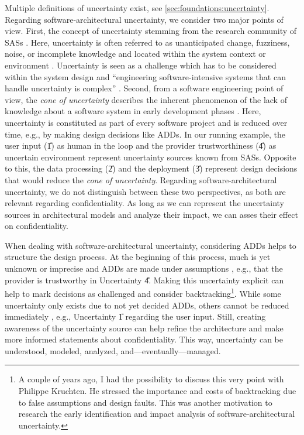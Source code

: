 Multiple definitions of uncertainty exist, see \autoref{sec:foundations:uncertainty}.
Regarding software-architectural uncertainty, we consider two major points of view.
First, the concept of uncertainty stemming from the research community of \acp{SAS} \cite{weyns_towards_2023,weyns_introduction_2020}.
Here, uncertainty is often referred to as unanticipated change, fuzziness, noise, or incomplete knowledge \cite{weyns_towards_2023} and located within the system context or environment \cite{weyns_introduction_2020}.
Uncertainty is seen as a challenge which has to be considered within the system design and \enquote{engineering software-intensive systems that can handle uncertainty is complex} \cite{weyns_introduction_2020}.
Second, from a software engineering point of view, the \emph{cone of uncertainty} describes the inherent phenomenon of the lack of knowledge about a software system in early development phases \cite{mcconnell_software_1998}.
Here, uncertainty is constituted as part of every software project and is reduced over time, e.g., by making design decisions like \acp{ADD}.
In our running example, the user input (\U{1}) as human in the loop and the provider trustworthiness (\U{4}) as uncertain environment represent uncertainty sources known from \acp{SAS}.
Opposite to this, the data processing (\U{2}) and the deployment (\U{3}) represent design decisions that would reduce the \emph{cone of uncertainty}.
Regarding software-architectural uncertainty, we do not distinguish between these two perspectives, as both are relevant regarding confidentiality.
As long as we can represent the uncertainty sources in architectural models and analyze their impact, we can asses their effect on confidentiality.

When dealing with software-architectural uncertainty, considering \acp{ADD} helps to structure the design process.
At the beginning of this process, much is yet unknown or imprecise and \acp{ADD} are made under assumptions \cite{mcconnell_software_1998}, e.g., that the provider is trustworthy in Uncertainty \U{4}.
Making this uncertainty explicit can help to mark decisions as challenged \cite{kruchten_ontology_2004} and consider backtracking\footnote{A couple of years ago, I had the possibility to discuss this very point with Philippe Kruchten. He stressed the importance and costs of backtracking due to false assumptions and design faults. This was another motivation to research the early identification and impact analysis of software-architectural uncertainty.}.
While some uncertainty only exists due to not yet decided \acp{ADD}, others cannot be reduced immediately \cite{perez-palacin_uncertainties_2014}, e.g., Uncertainty \U{1} regarding the user input.
Still, creating awareness of the uncertainty source can help refine the architecture and make more informed statements about confidentiality.
This way, uncertainty can be understood, modeled, analyzed, and---eventually---managed.

